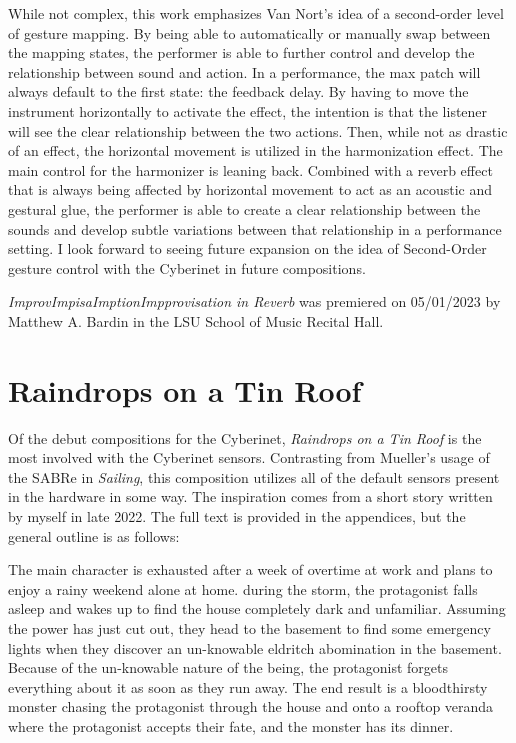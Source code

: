 While not complex, this work emphasizes Van Nort's idea of a second-order level of gesture mapping\cite{vanNortMapping2007}. By being able to automatically or manually swap between the mapping states, the performer is able to further control and develop the relationship between sound and action. In a performance, the max patch will always default to the first state: the feedback delay. By having to move the instrument horizontally to activate the effect, the intention is that the listener will see the clear relationship between the two actions. Then, while not as drastic of an effect, the horizontal movement is utilized in the harmonization effect. The main control for the harmonizer is leaning back. Combined with a reverb effect that is always being affected by horizontal movement to act as an acoustic and gestural glue, the performer is able to create a clear relationship between the sounds and develop subtle variations between that relationship in a performance setting. I look forward to seeing future expansion on the idea of Second-Order gesture control with the Cyberinet in future compositions.

\textit{ImprovImpisaImptionImpprovisation in Reverb} was premiered on 05/01/2023 by Matthew A. Bardin in the LSU School of Music Recital Hall.

\section{Raindrops on a Tin Roof}
Of the debut compositions for the Cyberinet, \textit{Raindrops on a Tin Roof} is the most involved with the Cyberinet sensors. Contrasting from Mueller's usage of the SABRe in \textit{Sailing}, this composition utilizes all of the default sensors present in the hardware in some way. The inspiration comes from a short story written by myself in late 2022. The full text is provided in the appendices, but the general outline is as follows:

The main character is exhausted after a week of overtime at work and plans to enjoy a rainy weekend alone at home. during the storm, the protagonist falls asleep and wakes up to find the house completely dark and unfamiliar. Assuming the power has just cut out, they head to the basement to find some emergency lights when they discover an un-knowable eldritch abomination in the basement. Because of the un-knowable nature of the being, the protagonist forgets everything about it as soon as they run away. The end result is a bloodthirsty monster chasing the protagonist through the house and onto a rooftop veranda where the protagonist accepts their fate, and the monster has its dinner.

